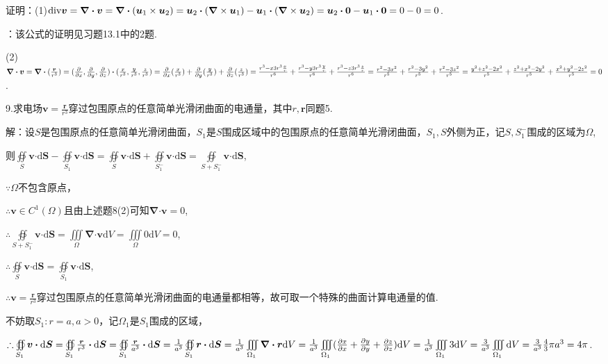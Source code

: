 \documentclass[12pt,UTF8,fleqn]{ctexart}
\newcommand{\IIInt}[3]{\iiint\limits_{#1}#2\mathrm d#3}
\newcommand{\md}[1]{\mathrm d#1}
\newcommand{\pp}[2]{\frac{\partial #1}{\partial #2}}
\newcommand{\ppx}[1]{\frac{\partial #1}{\partial x}}
\newcommand{\ppy}[1]{\frac{\partial #1}{\partial y}}
\newcommand{\ppz}[1]{\frac{\partial #1}{\partial z}}
\newcommand{\varppx}[1]{\frac{\partial}{\partial x} #1}
\newcommand{\varppy}[1]{\frac{\partial}{\partial y} #1}
\newcommand{\varppz}[1]{\frac{\partial}{\partial z} #1}
\newcommand{\BSOIInt}[2]{\oiint\limits_{#1}#2}
\begin{document}
\begin{enumerate}
证明：(1)$\text{div}\bm v=\bm\nabla\bm\cdot\bm v=\bm\nabla\bm\cdot(\bm u_1\times\bm u_2)=\bm u_2\bm\cdot(\bm\nabla\times\bm u_1)-\bm u_1\bm\cdot(\bm\nabla\times\bm u_2)\\
=\bm u_2\bm\cdot\bm0-\bm u_1\bm\cdot\bm0=0-0=0$.

{：}该公式的证明见习题13.1中的2题.

(2)$\bm\nabla\bm\cdot\bm v=\bm\nabla\bm\cdot(\frac{\bm r}{r^3})=(\ppx{},\ppy{},\ppz{})\bm\cdot(\frac x{r^3},\frac y{r^3},\frac z{r^3})=\varppx{(\frac x{r^3})}+\varppy{(\frac y{r^3})}+\varppz{(\frac z{r^3})}\\
=\frac{r^3-x3r^3\frac xr}{r^6}+\frac{r^3-y3r^3\frac yr}{r^6}+\frac{r^3-z3r^3\frac zr}{r^6}=\frac{r^2-3x^2}{r^5}+\frac{r^2-3y^2}{r^5}+\frac{r^2-3z^2}{r^5}\\
=\frac{y^2+z^2-2x^2}{r^5}+\frac{z^2+x^2-2y^2}{r^5}+\frac{x^2+y^2-2z^2}{r^5}=0$.

9.求电场$\bm v=\frac{\bm r}{r^3}$穿过包围原点的任意简单光滑闭曲面的电通量，其中$r,\bm r$同题5.

解：设$S$是包围原点的任意简单光滑闭曲面，$S_1$是$S$围成区域中的包围原点的任意简单光滑闭曲面，$S_1,S$外侧为正，记$S,S_1^-$围成的区域为$\Omega$,

则$\BSOIInt S{\bm v\bm\cdot\md\bm S}-\BSOIInt{S_1}{\bm v\bm\cdot\md\bm S}=\BSOIInt S{\bm v\bm\cdot\md\bm S}+\BSOIInt{S_1^-}{\bm v\bm\cdot\md\bm S}=\BSOIInt{S+S_1^-}{\bm v\bm\cdot\md\bm S}$,

$\because\Omega$不包含原点，

$\therefore\bm v\in C^1(\Omega)$且由上述题8(2)可知$\bm\nabla\bm\cdot\bm v=0$,

$\therefore\BSOIInt{S+S_1^-}{\bm v\bm\cdot\md\bm S}=\IIInt\Omega{\bm\nabla\bm\cdot\bm v}V=\IIInt\Omega0V=0$,

$\therefore\BSOIInt S{\bm v\bm\cdot\md\bm S}=\BSOIInt{S_1}{\bm v\bm\cdot\md\bm S}$,

$\therefore\bm v=\frac{\bm r}{r^3}$穿过包围原点的任意简单光滑闭曲面的电通量都相等，故可取一个特殊的曲面计算电通量的值.

不妨取$S_1:r=a,a>0$，记$\Omega_1$是$S_1$围成的区域，

$\therefore\BSOIInt{S_1}{\bm v\bm\cdot\md\bm S}=\BSOIInt{S_1}{\frac{\bm r}{r^3}\bm\cdot\md\bm S}=\BSOIInt{S_1}{\frac{\bm r}{a^3}\bm\cdot\md\bm S}=\frac1{a^3}\BSOIInt{S_1}{\bm r\bm\cdot\md\bm S}=\frac1{a^3}\IIInt{\Omega_1}{\bm\nabla\bm\cdot\bm r}V\\
=\frac1{a^3}\IIInt{\Omega_1}{(\pp xx+\pp yy+\pp zz)}V=\frac1{a^3}\IIInt{\Omega_1}{3}V=\frac3{a^3}\IIInt{\Omega_1}{}V=\frac3{a^3}\frac43\pi a^3=4\pi$.\footnotemark{}
\end{enumerate}
\end{document}
